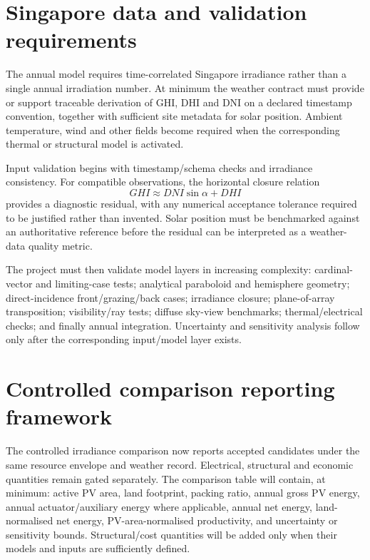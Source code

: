 \documentclass[11pt,a4paper]{article}
\begin{document}
\section{Singapore data and validation requirements}
The annual model requires time-correlated Singapore irradiance rather than a single annual irradiation number. At minimum the weather contract must provide or support traceable derivation of GHI, DHI and DNI on a declared timestamp convention, together with sufficient site metadata for solar position. Ambient temperature, wind and other fields become required when the corresponding thermal or structural model is activated.

Input validation begins with timestamp/schema checks and irradiance consistency. For compatible observations, the horizontal closure relation
\begin{equation}
GHI \approx DNI\sin\alpha + DHI
\end{equation}
provides a diagnostic residual, with any numerical acceptance tolerance required to be justified rather than invented. Solar position must be benchmarked against an authoritative reference before the residual can be interpreted as a weather-data quality metric.

The project must then validate model layers in increasing complexity: cardinal-vector and limiting-case tests; analytical paraboloid and hemisphere geometry; direct-incidence front/grazing/back cases; irradiance closure; plane-of-array transposition; visibility/ray tests; diffuse sky-view benchmarks; thermal/electrical checks; and finally annual integration. Uncertainty and sensitivity analysis follow only after the corresponding input/model layer exists.

\section{Controlled comparison reporting framework}
The controlled irradiance comparison now reports accepted candidates under the same resource envelope and weather record. Electrical, structural and economic quantities remain gated separately. The comparison table will contain, at minimum: active PV area, land footprint, packing ratio, annual gross PV energy, annual actuator/auxiliary energy where applicable, annual net energy, land-normalised net energy, PV-area-normalised productivity, and uncertainty or sensitivity bounds. Structural/cost quantities will be added only when their models and inputs are sufficiently defined.
\end{document}
